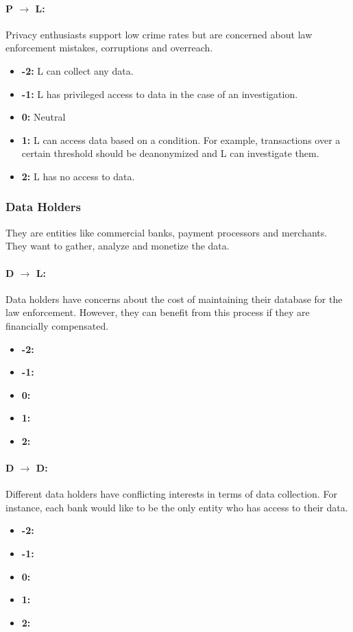 \documentclass[runningheads]{llncs}
\begin{document}
\paragraph{P $\rightarrow$ L:} Privacy enthusiasts support low crime rates but are concerned about law enforcement mistakes, corruptions and overreach.
   \begin{itemize}
	\item \textbf{-2:} L can collect any data.
	\item \textbf{-1:} L has privileged access to data in the case of an investigation.
	\item \textbf{0:} Neutral
	\item \textbf{1:} L can access data based on a condition. For example, transactions over a certain threshold should be deanonymized and L can investigate them.
	\item \textbf{2:} L has no access to data.
\end{itemize}

 \subsubsection{Data Holders} 
 They are entities like commercial banks, payment processors and merchants. They want to gather, analyze and monetize the data.
 \paragraph{D $\rightarrow$ L:}
 Data holders have concerns about the cost of maintaining their database for the law enforcement. However, they can benefit from this process if they are financially compensated.
   \begin{itemize}
 	\item \textbf{-2:}
 	\item \textbf{-1:}
 	\item \textbf{0:}
 	\item \textbf{1:}
 	\item \textbf{2:}
 \end{itemize}
  \paragraph{D $\rightarrow$ D:}
 Different data holders have conflicting interests in terms of data collection. For instance, each bank would like to be the only entity who has access to their data.
    \begin{itemize}
 	\item \textbf{-2:}
 	\item \textbf{-1:}
 	\item \textbf{0:}
 	\item \textbf{1:}
 	\item \textbf{2:}
 \end{itemize}
 
\end{document}
